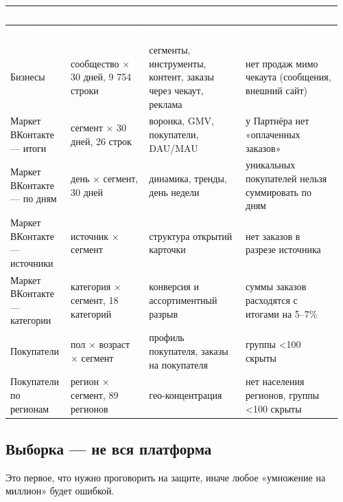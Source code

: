 \documentclass[10pt,a4paper]{article}
\begin{document}
\begingroup
\small
\setlength{\tabcolsep}{3pt}
\renewcommand{\arraystretch}{1.12}
\begin{longtable}{@{}>{\raggedright\arraybackslash}p{0.1751\linewidth}>{\raggedright\arraybackslash}p{0.2126\linewidth}>{\raggedright\arraybackslash}p{0.2877\linewidth}>{\raggedright\arraybackslash}p{0.2877\linewidth}@{}}
\rowcolor{blue}
\textcolor{white}{\textbf{Лист}} & \textcolor{white}{\textbf{Гранулярность}} & \textcolor{white}{\textbf{Что даёт}} & \textcolor{white}{\textbf{Ограничение}} \\
\endfirsthead
\rowcolor{blue}
\textcolor{white}{\textbf{Лист}} & \textcolor{white}{\textbf{Гранулярность}} & \textcolor{white}{\textbf{Что даёт}} & \textcolor{white}{\textbf{Ограничение}} \\
\endhead
\hline
Бизнесы & сообщество × 30 дней, 9 754 строки & сегменты, инструменты, контент, заказы через чекаут, реклама & нет продаж мимо чекаута (сообщения, внешний сайт) \\
Маркет ВКонтакте — итоги & сегмент × 30 дней, 26 строк & воронка, GMV, покупатели, DAU/MAU & у Партнёра нет «оплаченных заказов» \\
Маркет ВКонтакте — по дням & день × сегмент, 30 дней & динамика, тренды, день недели & уникальных покупателей нельзя суммировать по дням \\
Маркет ВКонтакте — источники & источник × сегмент & структура открытий карточки & нет заказов в разрезе источника \\
Маркет ВКонтакте — категории & категория × сегмент, 18 категорий & конверсия и ассортиментный разрыв & суммы заказов расходятся с итогами на 5–7\% \\
Покупатели & пол × возраст × сегмент & профиль покупателя, заказы на покупателя & группы <100 скрыты \\
Покупатели по регионам & регион × сегмент, 89 регионов & гео-концентрация & нет населения регионов, группы <100 скрыты \\
\hline
\end{longtable}
\endgroup
\vspace{4pt}

\subsection{Выборка — не вся платформа}

Это первое, что нужно проговорить на защите, иначе любое «умножение на миллион» будет ошибкой.\par
\end{document}
